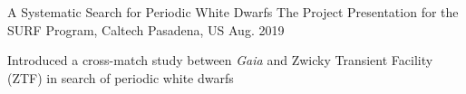 


\begin{cventries}
	
	
	\cventry
	{A Systematic Search for Periodic White Dwarfs} %
	{The Project Presentation for the SURF Program, Caltech} %
	{Pasadena, US} %
	{Aug. 2019} %
	{%
		\begin{cvitems}
			\item {Introduced a cross-match study between \textit{Gaia} and Zwicky Transient Facility (ZTF) in search of periodic white dwarfs}
		\end{cvitems}
	}
\end{cventries}